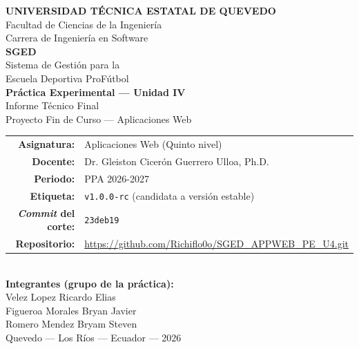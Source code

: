 \documentclass[11pt,a4paper]{article}
\begin{document}
\begin{titlepage}
\centering
\vspace*{1cm}

{\LARGE\bfseries UNIVERSIDAD TÉCNICA ESTATAL DE QUEVEDO}\\[0.3cm]
{\large Facultad de Ciencias de la Ingeniería}\\[0.15cm]
{\large Carrera de Ingeniería en Software}\\[2cm]

{\Huge\bfseries\color{uteqverde} SGED}\\[0.4cm]
{\Large Sistema de Gestión para la\\Escuela Deportiva ProFútbol}\\[1.5cm]

{\LARGE\bfseries Práctica Experimental --- Unidad IV}\\[0.4cm]
{\large Informe Técnico Final}\\[0.3cm]
{\large Proyecto Fin de Curso --- Aplicaciones Web}\\[2cm]

\begin{tabular}{rl}
\textbf{Asignatura:} & Aplicaciones Web (Quinto nivel) \\[0.2cm]
\textbf{Docente:} & Dr. Gleiston Cicerón Guerrero Ulloa, Ph.D. \\[0.2cm]
\textbf{Periodo:} & PPA 2026-2027 \\[0.2cm]
\textbf{Etiqueta:} & \texttt{v1.0.0-rc} (candidata a versión estable) \\[0.2cm]
\textbf{\emph{Commit} del corte:} & \texttt{23deb19} \\[0.2cm]
\textbf{Repositorio:} & \url{https://github.com/Richiflo0o/SGED_APPWEB_PE_U4.git} \\
\end{tabular}\\[1.5cm]

{\large\bfseries Integrantes (grupo de la práctica):}\\[0.3cm]
{\large Velez Lopez Ricardo Elias}\\
{\large Figueroa Morales Bryan Javier}\\
{\large Romero Mendez Bryam Steven}\\[1.5cm]

{\large Quevedo --- Los Ríos --- Ecuador --- 2026}

\vfill
\end{titlepage}
\end{document}

